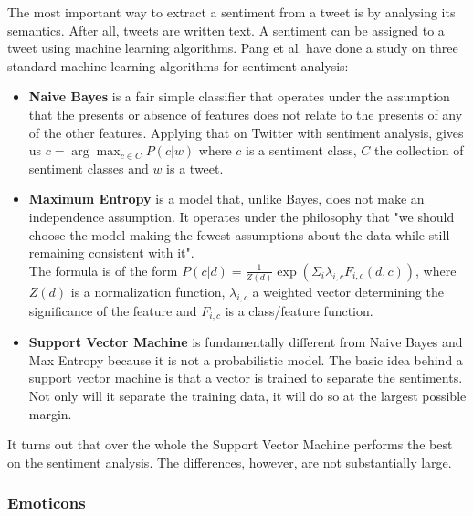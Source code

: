\documentclass{article}
\begin{document}
The most important way to extract a sentiment from a tweet is by analysing its semantics. After all, tweets are written text. A sentiment can be assigned to a tweet using machine learning algorithms. Pang et al. \cite{machineLearning} have done a study on three standard machine learning algorithms for sentiment analysis: 
\begin{itemize}
\item \textbf{Naive Bayes} is a fair simple classifier that operates under the assumption that the presents or absence of features does not relate to the presents of any of the other features. Applying that on Twitter with sentiment analysis, gives us $c = \arg\max_{c\in C} P(c|w)$ where $c$ is a sentiment class, $C$ the collection of sentiment classes and $w$ is a tweet. \cite{sentAnalysis}
\item \textbf{Maximum Entropy} is a model that, unlike Bayes, does not make an independence assumption. It operates under the philosophy that "we should choose the model making the fewest assumptions about the data while still remaining consistent with it".\cite{machineLearning} \\
The formula is of the form $P(c|d) = \frac{1}{Z(d)}\exp(\Sigma_i \lambda_{i,c}F_{i,c}(d,c))$, where $Z(d)$ is a normalization function, $\lambda_{i,c}$ a weighted vector determining the significance of the feature and $F_{i,c}$ is a class/feature function. 
\item \textbf{Support Vector Machine} is fundamentally different from Naive Bayes and Max Entropy because it is not a probabilistic model. The basic idea behind a support vector machine is that a vector is trained to separate the sentiments. Not only will it separate the training data, it will do so at the largest possible margin. 
\end{itemize}
It turns out that over the whole the Support Vector Machine performs the best on the sentiment analysis\cite{machineLearning}. The differences, however, are not substantially large. 

\subsubsection*{Emoticons}
\end{document}
